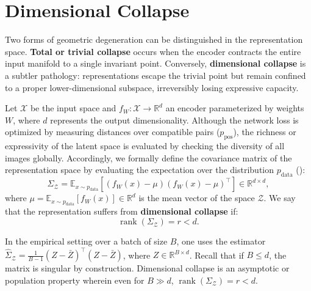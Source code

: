\documentclass[11pt, oneside, openany]{book}
\DeclareMathOperator{\rank}{rank}
\begin{document}
\section{Dimensional Collapse}
\label{sec:3.3}

Two forms of geometric degeneration can be distinguished in the representation space. \textbf{Total or trivial collapse} occurs when the encoder contracts the entire input manifold to a single invariant point. Conversely, \textbf{dimensional collapse} is a subtler pathology: representations escape the trivial point but remain confined to a proper lower-dimensional subspace, irreversibly losing expressive capacity.

\begin{definition}
\label{def:3.2}
Let $\mathcal{X}$ be the input space and $f_{W} \colon \mathcal{X} \to \mathbb{R}^{d}$ an encoder parameterized by weights $W$, where $d$ represents the output dimensionality. Although the network loss is optimized by measuring distances over compatible pairs ($p_{\text{pos}}$), the richness or expressivity of the latent space is evaluated by checking the diversity of all images globally. Accordingly, we formally define the covariance matrix of the representation space by evaluating the expectation over the distribution $p_{\text{data}}$ ():
\begin{equation}
\label{eq:3.11}
\Sigma_{\mathcal{Z}} = \mathbb{E}_{x \sim p_{\text{data}}} \left[ (f_{W}(x) - \mu)(f_{W}(x) - \mu)^{\top} \right] \in \mathbb{R}^{d \times d},
\end{equation}
where $\mu = \mathbb{E}_{x \sim p_{\text{data}}}[f_{W}(x)] \in \mathbb{R}^{d}$ is the mean vector of the space $\mathcal{Z}$. We say that the representation suffers from \textbf{dimensional collapse} if:
\begin{equation}
\label{eq:3.12}
\rank(\Sigma_{\mathcal{Z}}) = r < d.
\end{equation}
\end{definition}

\begin{remark}
\label{rem:3.2}
In the empirical setting over a batch of size $B$, one uses the estimator $\hat{\Sigma}_{\mathcal{Z}} = \frac{1}{B-1}(Z - \bar{Z})^{\top}(Z - \bar{Z})$, where $Z \in \mathbb{R}^{B \times d}$. Recall that if $B \leq d$, the matrix is singular by construction. Dimensional collapse is an asymptotic or population property wherein even for $B \gg d$, $\rank(\Sigma_{\mathcal{Z}}) = r < d$.
\end{remark}
\end{document}
